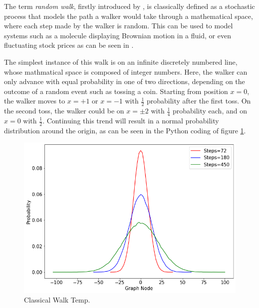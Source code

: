 \documentclass[../../dissertation.tex]{subfiles}
\begin{document}
The term \textit{random walk}, firstly introduced by \cite{kpearson1905}, is
classically defined as a stochastic process that models the path a walker would
take through a mathematical space, where each step made by the walker is
random. This can be used to model systems such as a molecule displaying
Brownian motion in a fluid, or even fluctuating stock prices as can be seen in
\cite{sottinen2001}.\par The simplest instance of this walk is on an infinite
discretely numbered line, whose mathmatical space is composed of integer
numbers. Here, the walker can only advance with equal probability in one of two
directions, depending on the outcome of a random event such as tossing a coin.
Starting from position $x=0$, the walker moves to $x = +1$ or $ x = -1$ with
$\frac{1}{2}$ probability after the first toss. On the second toss, the walker
could be on $x =\pm 2$ with $\frac{1}{4}$ probability each, and on $x = 0$ with
$\frac{1}{2}$.  Continuing this trend will result in a normal probability
distribution around the origin, as can be seen in the Python coding of figure
\ref{fig:MultClassicalWalk72180450}.
\begin{figure}[!h]
	\centering
	\includegraphics[scale=0.40]{img/ClassicalWalk/MultClassicalWalk72180450}
	\caption{Classical Walk Temp.} 
	\label{fig:MultClassicalWalk72180450}
\end{figure}\par
\end{document}
